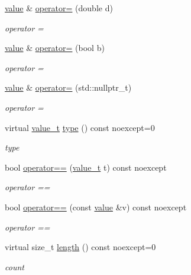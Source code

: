 \begin{DoxyCompactItemize}
\hyperlink{classformat_1_1value}{value} \& \hyperlink{classformat_1_1value_a1636e6762c97584eb15b85b6a6422055}{operator=} (double d)
\begin{DoxyCompactList}\small\item\em operator = \end{DoxyCompactList}\item 
\hyperlink{classformat_1_1value}{value} \& \hyperlink{classformat_1_1value_a017ba8a51e1005652ab3113c6b0951ec}{operator=} (bool b)
\begin{DoxyCompactList}\small\item\em operator = \end{DoxyCompactList}\item 
\hyperlink{classformat_1_1value}{value} \& \hyperlink{classformat_1_1value_a0c62128d9917513e97068a267b4543ca}{operator=} (std\+::nullptr\+\_\+t)
\begin{DoxyCompactList}\small\item\em operator = \end{DoxyCompactList}\item 
virtual \hyperlink{classformat_1_1value_aa0334be06389a7b14af485fa0cd3aa21}{value\+\_\+t} \hyperlink{classformat_1_1value_a7112d0f83cf61aa9e1cdde90fc444996}{type} () const noexcept=0
\begin{DoxyCompactList}\small\item\em type \end{DoxyCompactList}\item 
bool \hyperlink{classformat_1_1value_a3bd4d42103322d1c6940e04554405a8e}{operator==} (\hyperlink{classformat_1_1value_aa0334be06389a7b14af485fa0cd3aa21}{value\+\_\+t} t) const noexcept
\begin{DoxyCompactList}\small\item\em operator == \end{DoxyCompactList}\item 
bool \hyperlink{classformat_1_1value_ad18cb4b5aef50630f5fab8a6d52816b7}{operator==} (const \hyperlink{classformat_1_1value}{value} \&v) const noexcept
\begin{DoxyCompactList}\small\item\em operator == \end{DoxyCompactList}\item 
virtual size\+\_\+t \hyperlink{classformat_1_1value_a406a9553c4d83a0613aa54d77f6c462d}{length} () const noexcept=0
\begin{DoxyCompactList}\small\item\em count \end{DoxyCompactList}\item 

\end{DoxyCompactItemize}
